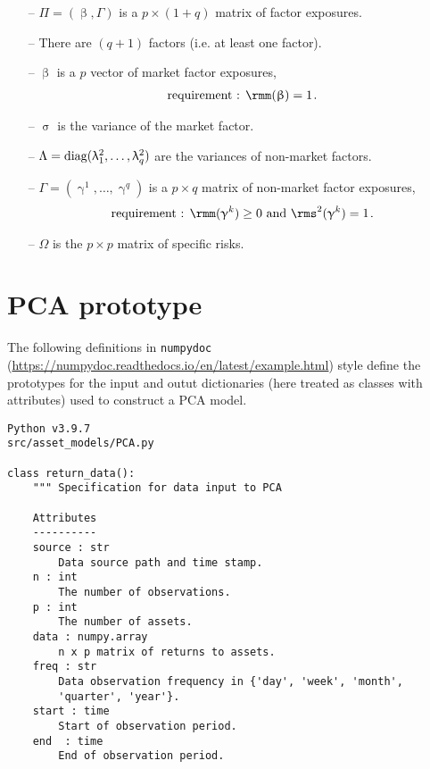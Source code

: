 \documentclass[leqno,12pt]{article}
\begin{document}
{\begin{mdframed}[style=wide]
\begin{itemize}
\item[--] $\Pi = (\upbeta, \Gamma)$ 
is a $p \times (1+q)$ matrix of factor exposures. 
\item[--] There are $(q + 1)$ factors (i.e. at least one
factor).
\item[--] $\upbeta$ is a $p$ vector of market factor exposures,
\begin{align*}
  \text{requirement : } \rmm(\upbeta) = 1 \s .
\end{align*}
\item[--] $\upsigma$ is the variance of the market factor.
\item[--] $\Lambda = \textrm{diag}(\uplambda^2_1, \dots, \uplambda^2_q)$
are the variances of non-market factors.
\item[--] $\Gamma = (\upgamma^1, \dots, \upgamma^q)$ is a $p \times q$ matrix of non-market
factor exposures,
\begin{align*}
  \text{requirement : }
  \rmm(\upgamma^k) \ge 0 \text{ and }
  \rms^2(\upgamma^k) = 1\s . 
\end{align*}
\item[--] $\Omega$ is the $p\times p$ matrix of specific
risks.
\end{itemize}


\end{mdframed}


\section{PCA prototype} 

The following definitions in \verb|numpydoc|
(\url{https://numpydoc.readthedocs.io/en/latest/example.html})
style define the prototypes for the input and outut
dictionaries (here treated as classes with attributes)
used to construct a PCA model.


\begin{verbatim}
Python v3.9.7
src/asset_models/PCA.py

class return_data():
    """ Specification for data input to PCA 

    Attributes
    ----------
    source : str
        Data source path and time stamp.
    n : int
        The number of observations.
    p : int
        The number of assets.
    data : numpy.array
        n x p matrix of returns to assets.
    freq : str
        Data observation frequency in {'day', 'week', 'month', 
        'quarter', 'year'}.
    start : time
        Start of observation period.
    end  : time
        End of observation period.


\end{verbatim}}
\end{document}
